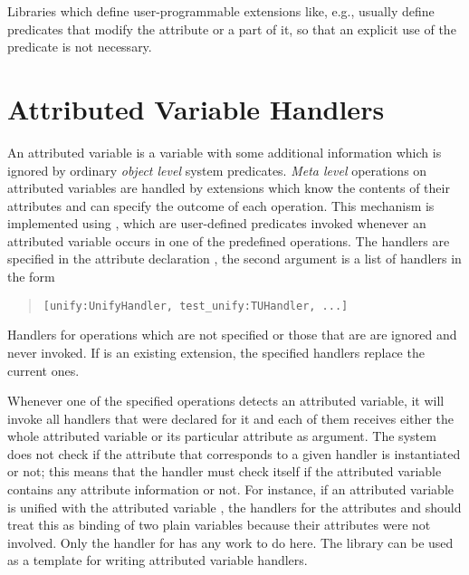 Libraries which define user-programmable extensions
like, e.g.,  usually define predicates that
modify the attribute or a part of it, so that an explicit
use of the  predicate
is not necessary.

\section{Attributed Variable Handlers}
\label{metahandlers}
An attributed variable is a variable with some additional information
which is ignored by ordinary \emph{object level} system predicates.
\emph{Meta level} operations on attributed variables are handled by
extensions which know
the contents of their attributes and can specify the outcome
of each operation.
This mechanism is implemented using ,
which are user-defined predicates invoked
whenever an attributed variable occurs in one of the predefined
operations.
The handlers are specified in the attribute declaration
, the second
argument
is a list of handlers in the form
\begin{quote}
\begin{verbatim}
[unify:UnifyHandler, test_unify:TUHandler, ...]
\end{verbatim}
\end{quote}
Handlers for operations which are not specified or those that are
 are ignored and never
invoked.
If  is an existing extension, the specified handlers
replace the current ones.

Whenever one of the specified operations detects an attributed variable,
it will invoke all handlers that were declared for it
and each of them receives either the whole attributed variable
or its particular attribute as argument.
The system does not check if the attribute that corresponds
to a given handler is instantiated or not; this means
that the handler must check itself if the attributed variable
contains any attribute information or not.
For instance, if an attributed variable 
is unified with the attributed variable ,
the handlers for the attributes  and  should
treat this as binding of two plain variables
because their attributes were not involved.
Only the handler for  has any work to do here.
The library  can be used as a template
for writing attributed variable handlers.

